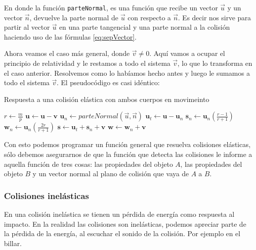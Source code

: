 En donde la función \verb|parteNormal|, es una función que recibe un vector $\vec{u}$ y un vector $\vec{n}$, devuelve la parte normal de $\vec{u}$ con respecto a $\vec{n}$. Es decir nos sirve para partir al vector $\vec{u}$ en una parte tangencial y una parte normal a la colisión haciendo uso de las fórmulas \ref{eq:sepVector}.

Ahora veamos el caso más general, donde $\vec{v} \neq 0$. Aquí vamos a ocupar el principio de relatividad y le restamos a todo el sistema $\vec{v}$, lo que lo transforma en el caso anterior. Resolvemos como lo habíamos hecho antes y luego le sumamos a todo el sistema $\vec{v}$. El pseudocódigo es casi idéntico:
 
{\centering
\begin{minipage}{\linewidth}
  \begin{algorithm}[H]
    \caption{Respuesta a una colisión elástica con ambos cuerpos en movimeinto}
    \label{alg:elasmov}
    \begin{algorithmic}[1] %
\State $r \gets \frac{m}{p}$
\State $\textbf{u} \gets \textbf{u} - \textbf{v}$
\State $\textbf{u}_n \gets parteNormal(\vec{u}, \vec{n})$
\State $\textbf{u}_t \gets \textbf{u} - \textbf{u}_n$
\State $\textbf{s}_n \gets \textbf{u}_n \left( \frac{r - 1}{r + 1} \right) $
\State $\textbf{w}_n \gets \textbf{u}_n \left( \frac{2r}{r + 1} \right) $
\State $\textbf{s} \gets \textbf{u}_t + \textbf{s}_n + \textbf{v}$
\State $\textbf{w} \gets \textbf{w}_n + \textbf{v}$
    \end{algorithmic}
  \end{algorithm}
\end{minipage}
\par
}

Con esto podemos programar un función general que resuelva colisiones elásticas, sólo debemos asegurarnos de que la función que detecta las colisiones le informe a aquella función de tres cosas: las propiedades del objeto $A$, las propiedades del objeto $B$ y un vector normal al plano de colisión que vaya de $A$ a $B$.

\subsubsection{Colisiones inelásticas}
En una colisión inelástica se tienen un pérdida de energía como respuesta al impacto. En la realidad las colisiones son inelásticas, podemos apreciar parte de la pérdida de la energía, al escuchar el sonido de la colisión. Por ejemplo en el billar.

